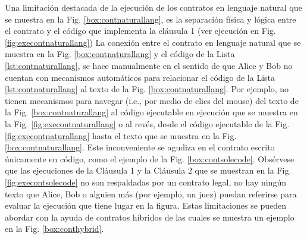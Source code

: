 \documentclass[12pt]{report} %
\begin{document}
Una limitación destacada de la ejecución de los contratos en lenguaje natural que se muestra en la Fig. \ref{box:contnaturallang}, es la separación física y lógica entre el contrato y el código que implementa la cláusula 1 (ver ejecución en Fig. \ref{fig:execontnaturallang}) La conexión entre el contrato en lenguaje natural que se muestra en la Fig. \ref{box:contnaturallang} y el código de la Lista \ref{lst:contnaturallang}, se hace manualmente en el sentido de que Alice y Bob no cuentan con mecanismos automáticos para relacionar el código de la Lista \ref{lst:contnaturallang}  al texto de la Fig. \ref{box:contnaturallang}. Por ejemplo, no tienen mecanismos para navegar (i.e., por medio de clics del mouse) del texto de la Fig. \ref{box:contnaturallang}  al código ejecutable en ejecución que se muestra en la Fig. \ref{fig:execontnaturallang} o al revés, desde el código ejecutable de la Fig.\ref{fig:execontnaturallang} hasta el texto que se muestra en la Fig. \ref{box:contnaturallang}. Este inconveniente se agudiza en el contrato escrito únicamente en código, como el ejemplo de la Fig. \ref{box:contsolecode}. Obsérvese que las ejecuciones de la Cláusula 1 y la Cláusula 2 que se muestran en la Fig. \ref{fig:execontsolecode} no son respaldadas por un contrato legal, no hay ningún texto que Alice, Bob o alguien más (por ejemplo, un juez) puedan referirse para evaluar la ejecución que tiene lugar en la figura. Estas limitaciones se pueden abordar con la ayuda de contratos híbridos de las cuales se muestra un ejemplo en la Fig. \ref{box:conthybrid}.
\end{document}
